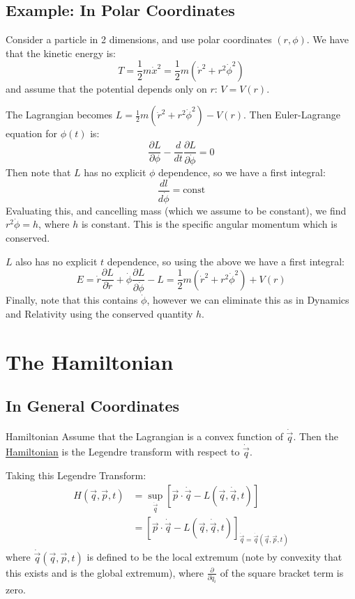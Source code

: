 \documentclass[../Main.tex]{subfiles}
\begin{document}
\subsection{Example: In Polar Coordinates}
Consider a particle in 2 dimensions, and use polar coordinates $(r, \phi)$. We have that the kinetic energy is:
\begin{equation*}
    T = \frac{1}{2} m \dot{x}^2 = \frac{1}{2} m (\dot{r}^2 + r^2 \dot{\phi}^2)
\end{equation*}
and assume that the potential depends only on $r$: $V = V(r)$.

The Lagrangian becomes $L = \frac12 m (\dot{r}^2 + r^2 \dot{\phi}^2) - V(r)$. Then Euler-Lagrange equation for $\phi(t)$ is:
\begin{equation*}
    \frac{\partial L}{\partial \phi} - \frac{d}{dt} \frac{\partial L}{\partial \dot{\phi}} = 0
\end{equation*}
Then note that $L$ has no explicit $\phi$ dependence, so we have a first integral:
\begin{equation*}
    \frac{dl}{d\dot{\phi}} = \text{const}
\end{equation*}
Evaluating this, and cancelling mass (which we assume to be constant), we find $r^2 \dot{\phi} = h$, where $h$ is constant. This is the specific angular momentum which is conserved.

$L$ also has no explicit $t$ dependence, so using the above we have a first integral:
\begin{equation*}
    E = \dot{r} \frac{\partial L}{\partial \dot{r}} + \dot{\phi} \frac{\partial L}{\partial \dot{\phi}} - L = \frac{1}{2} m(\dot{r}^2 + r^2 \dot{\phi}^2) + V(r)
\end{equation*}
Finally, note that this contains $\dot{\phi}$, however we can eliminate this as in Dynamics and Relativity using the conserved quantity $h$.
\section{The Hamiltonian}
\subsection{In General Coordinates}
\begin{definition}{Hamiltonian}
    Assume that the Lagrangian is a convex function of $\dot{\vec{q}}$. Then the\\\underline{Hamiltonian} is the Legendre transform with respect to $\dot{\vec{q}}$.
\end{definition}
Taking this Legendre Transform:
\begin{align}
    H(\vec{q}, \vec{p}, t) &= \sup_{\dot{\vec{q}}} \left[\vec{p} \cdot \dot{\vec{q}} - L(\vec{q}, \dot{\vec{q}}, t)\right] \label{eqnHamiltonian} \\
    &= \left[\vec{p} \cdot \dot{\vec{q}} - L(\vec{q}, \dot{\vec{q}}, t)\right]_{\dot{\vec{q}} = \dot{\vec{q}}(\vec{q}, \vec{p}, t)} \nonumber
\end{align}
where $\dot{\vec{q}}(\vec{q}, \vec{p}, t)$ is defined to be the local extremum (note by convexity that this exists and is the global extremum), where $\frac{\partial}{\partial \dot{q}_i}$ of the square bracket term is zero.
\end{document}
